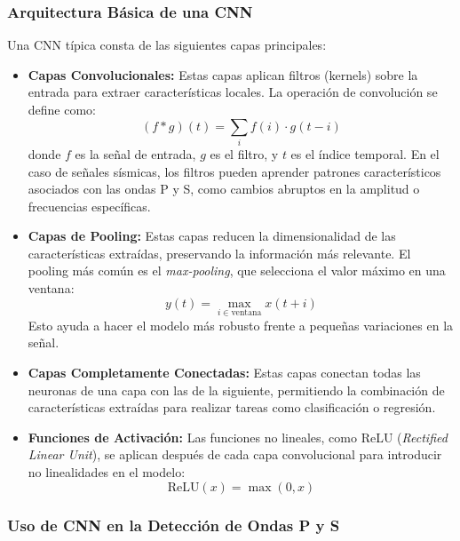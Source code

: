 \subsubsection{Arquitectura Básica de una CNN}

Una CNN típica consta de las siguientes capas principales:

\begin{itemize}
     \item \textbf{Capas Convolucionales:} Estas capas aplican filtros (kernels) sobre la entrada para extraer características locales. La operación de convolución se define como:
     \begin{equation}
          (f * g)(t) = \sum_{i} f(i) \cdot g(t - i)
     \end{equation}
     donde $f$ es la señal de entrada, $g$ es el filtro, y $t$ es el índice temporal. En el caso de señales sísmicas, los filtros pueden aprender patrones característicos asociados con las ondas P y S, como cambios abruptos en la amplitud o frecuencias específicas.

     \item \textbf{Capas de Pooling:} Estas capas reducen la dimensionalidad de las características extraídas, preservando la información más relevante. El pooling más común es el \textit{max-pooling}, que selecciona el valor máximo en una ventana:
     \begin{equation}
          y(t) = \max_{i \in \text{ventana}} x(t + i)
     \end{equation}
     Esto ayuda a hacer el modelo más robusto frente a pequeñas variaciones en la señal.

     \item \textbf{Capas Completamente Conectadas:} Estas capas conectan todas las neuronas de una capa con las de la siguiente, permitiendo la combinación de características extraídas para realizar tareas como clasificación o regresión.

     \item \textbf{Funciones de Activación:} Las funciones no lineales, como ReLU (\textit{Rectified Linear Unit}), se aplican después de cada capa convolucional para introducir no linealidades en el modelo:
     \begin{equation}
          \text{ReLU}(x) = \max(0, x)
     \end{equation}
\end{itemize}

\subsubsection{Uso de CNN en la Detección de Ondas P y S}

